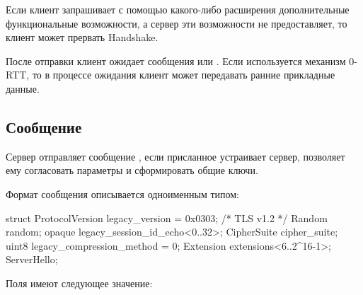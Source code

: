 Если клиент запрашивает с помощью какого-либо расширения дополнительные 
функциональные возможности, а сервер эти возможности не предоставляет, то 
клиент может прервать Handshake.

После отправки  клиент ожидает сообщения
 или . Если
используется механизм 0-RTT, то в процессе ожидания клиент может передавать
ранние прикладные данные.

\subsection{Сообщение }\label{HS.SH} 

Сервер отправляет сообщение , если присланное 
 устраивает сервер, позволяет ему
согласовать параметры и сформировать общие ключи.

Формат сообщения  описывается одноименным типом:
%
\begin{codeblock}
struct {
  ProtocolVersion legacy_version = 0x0303;    /* TLS v1.2 */
  Random random;
  opaque legacy_session_id_echo<0..32>;
  CipherSuite cipher_suite;
  uint8 legacy_compression_method = 0;
  Extension extensions<6..2^16-1>;
} ServerHello;
\end{codeblock}

Поля  имеют следующее значение:

